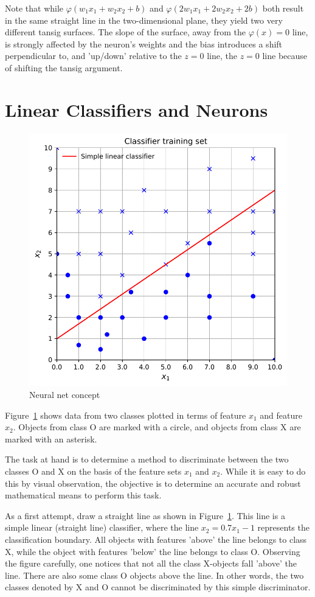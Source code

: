 Note that while $\varphi(w_1x_1+w_2x_2+b)$  and  $\varphi(2w_1x_1+2w_2x_2+2b)$ both result in the same straight line in the two-dimensional plane, they yield two very different tansig surfaces.  The slope of the surface, away from the  $\varphi(x)=0$ line, is strongly affected by the neuron's weights and the bias introduces a shift perpendicular to, and 'up/down' relative to the $z=0$ line, the $z=0$ line because of shifting the tansig  argument.  

\section{Linear Classifiers and Neurons}

\begin{figure}[tb]
\centering
\includegraphics[width=.6\textwidth]{pic/chC-trainingset}
\caption{Neural net concept\label{fig:chC-trainingset}}
\end{figure}

Figure~\ref{fig:chC-trainingset} shows data from two classes plotted in terms of feature $x_1$ and feature $x_2$.  Objects from class O are marked with a circle, and objects from class X are marked with an asterisk.  

The task at hand is to determine a method to discriminate between the two classes O and X on the basis of the feature sets $x_1$ and $x_2$.  While it is easy to do this by visual observation, the objective is to determine an accurate and robust mathematical means to perform this task.  

As a first attempt, draw a straight line as shown in Figure~\ref{fig:chC-trainingset}.  This line is a simple linear (straight line) classifier, where the line $x_2=0.7x_1-1$  represents the classification boundary.  All objects with features 
'above' the line belongs to class X, while the object with features 
'below' the line belongs to class O.  Observing the figure carefully, one notices that not all the class X-objects fall 'above' the line.  There are also some class O objects above the line.   In other words, the two classes denoted by X and O cannot be discriminated by this simple discriminator.  

